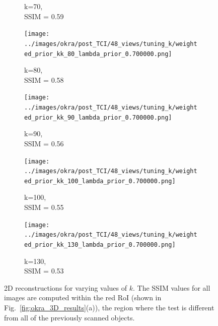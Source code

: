 \documentclass[journal]{IEEEtran}
\begin{document}
\begin{figure}[h]
\begin{subfigure}[b]{0.24\linewidth}
        \caption{k=70,\\ SSIM = 0.59}
     \end{subfigure}
  \begin{subfigure}[b]{0.24\linewidth}
        \texttt{[image: ../images/okra/post\_TCI/48\_views/tuning\_k/weighted\_prior\_kk\_80\_lambda\_prior\_0.700000.png]}
        \caption{k=80,\\ SSIM = 0.58}
     \end{subfigure}
   \begin{subfigure}[b]{0.24\linewidth}
        \texttt{[image: ../images/okra/post\_TCI/48\_views/tuning\_k/weighted\_prior\_kk\_90\_lambda\_prior\_0.700000.png]}
        \caption{k=90,\\ SSIM = 0.56}
     \end{subfigure}
   \begin{subfigure}[b]{0.24\linewidth}
        \texttt{[image: ../images/okra/post\_TCI/48\_views/tuning\_k/weighted\_prior\_kk\_100\_lambda\_prior\_0.700000.png]}
        \caption{k=100,\\ SSIM = 0.55}
     \end{subfigure}
   \begin{subfigure}[b]{0.24\linewidth}
        \texttt{[image: ../images/okra/post\_TCI/48\_views/tuning\_k/weighted\_prior\_kk\_130\_lambda\_prior\_0.700000.png]}
        \caption{k=130,\\ SSIM = 0.53}
     \end{subfigure}
    \caption{2D reconstructions for varying values of $k$. The SSIM values for all images are computed within the red RoI (shown in Fig.~\ref{fig:okra_3D_results}(a)), the region where the test is different from all of the previously scanned objects.}
\label{fig:reconstructions_as_k_varies}
\end{figure}


\end{document}
